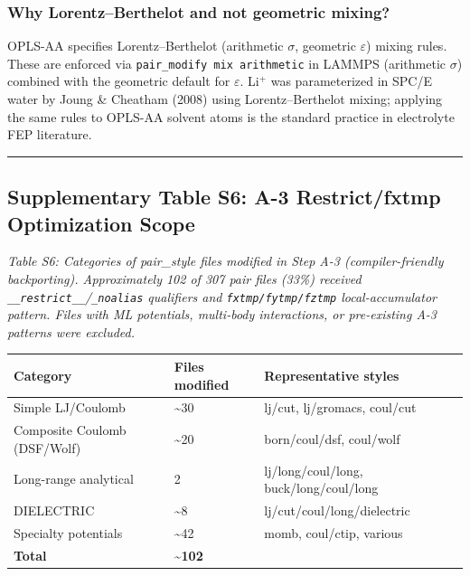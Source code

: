 \documentclass[
  11pt,
]{article}
\newcounter{none} %
\begin{document}
\subsubsection{Why Lorentz--Berthelot and not geometric
mixing?}\label{why-lorentzberthelot-and-not-geometric-mixing}

OPLS-AA specifies Lorentz--Berthelot (arithmetic \(\sigma\), geometric
\(\varepsilon\)) mixing rules. These are enforced via
\texttt{pair\_modify\ mix\ arithmetic} in LAMMPS (arithmetic \(\sigma\))
combined with the geometric default for \(\varepsilon\). Li\(^{+}\) was
parameterized in SPC/E water by Joung \& Cheatham (2008) using
Lorentz--Berthelot mixing; applying the same rules to OPLS-AA solvent
atoms is the standard practice in electrolyte FEP literature.

\begin{center}\rule{0.5\linewidth}{0.5pt}\end{center}

\subsection{Supplementary Table S6: A-3 Restrict/fxtmp Optimization
Scope}\label{supplementary-table-s6-a-3-restrictfxtmp-optimization-scope}

\emph{Table S6: Categories of pair\_style files modified in Step A-3
(compiler-friendly backporting). Approximately 102 of 307 pair files
(33\%) received \texttt{\_\_restrict\_\_}/\texttt{\_noalias} qualifiers
and \texttt{fxtmp/fytmp/fztmp} local-accumulator pattern. Files with ML
potentials, multi-body interactions, or pre-existing A-3 patterns were
excluded.}

{\def\LTcaptype{none} %
\begin{longtable}[]{@{}lll@{}}
\toprule\noalign{}
Category & Files modified & Representative styles \\
\midrule\noalign{}
\endhead
\bottomrule\noalign{}
\endlastfoot
Simple LJ/Coulomb & \textasciitilde30 & lj/cut, lj/gromacs, coul/cut \\
Composite Coulomb (DSF/Wolf) & \textasciitilde20 & born/coul/dsf,
coul/wolf \\
Long-range analytical & 2 & lj/long/coul/long, buck/long/coul/long \\
DIELECTRIC & \textasciitilde8 & lj/cut/coul/long/dielectric \\
Specialty potentials & \textasciitilde42 & momb, coul/ctip, various \\
\textbf{Total} & \textbf{\textasciitilde102} & \\
\end{longtable}
}
\end{document}
